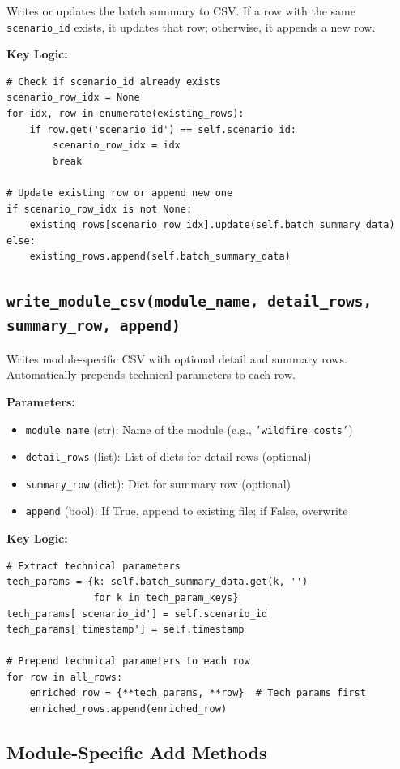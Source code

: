 \documentclass[ctcc_full_documentation.tex]{subfiles}
\begin{document}
Writes or updates the batch summary to CSV. If a row with the same \texttt{scenario\_id} exists, it updates that row; otherwise, it appends a new row.

\textbf{Key Logic:}
\begin{lstlisting}
# Check if scenario_id already exists
scenario_row_idx = None
for idx, row in enumerate(existing_rows):
    if row.get('scenario_id') == self.scenario_id:
        scenario_row_idx = idx
        break

# Update existing row or append new one
if scenario_row_idx is not None:
    existing_rows[scenario_row_idx].update(self.batch_summary_data)
else:
    existing_rows.append(self.batch_summary_data)
\end{lstlisting}

\subsection{\texttt{write\_module\_csv(module\_name, detail\_rows, summary\_row, append)}}

Writes module-specific CSV with optional detail and summary rows. Automatically prepends technical parameters to each row.

\textbf{Parameters:}
\begin{itemize}
    \item \texttt{module\_name} (str): Name of the module (e.g., \texttt{'wildfire\_costs'})
    \item \texttt{detail\_rows} (list): List of dicts for detail rows (optional)
    \item \texttt{summary\_row} (dict): Dict for summary row (optional)
    \item \texttt{append} (bool): If True, append to existing file; if False, overwrite
\end{itemize}

\textbf{Key Logic:}
\begin{lstlisting}
# Extract technical parameters
tech_params = {k: self.batch_summary_data.get(k, '') 
               for k in tech_param_keys}
tech_params['scenario_id'] = self.scenario_id
tech_params['timestamp'] = self.timestamp

# Prepend technical parameters to each row
for row in all_rows:
    enriched_row = {**tech_params, **row}  # Tech params first
    enriched_rows.append(enriched_row)
\end{lstlisting}

\subsection{Module-Specific Add Methods}
\end{document}
